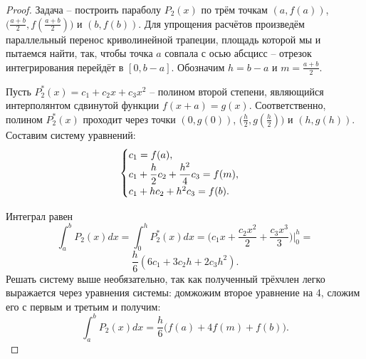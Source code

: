 \documentclass[../main.tex]{subfile}
\begin{document}
\begin{proof}
	Задача -- построить параболу $P_2(x)$ по трём точкам $(a,f(a))$,
	$\big(\frac{a+b}{2},f(\frac{a+b}{2})\big)$ и $(b,f(b))$. Для упрощения
	расчётов произведём параллельный перенос криволинейной трапеции, площадь
	которой мы и пытаемся найти, так, чтобы точка $a$ совпала с осью
	абсцисс -- отрезок интегрирования перейдёт в $[0,b-a]$. Обозначим
	$h=b-a$ и $m=\frac{a+b}{2}$.

	Пусть $P_2^*(x)=c_1+c_2x+c_3x^2$ -- полином второй степени, являющийся
	интерполянтом сдвинутой функции $f(x+a)=g(x)$. Соответственно, полином
	$P_2^*(x)$ проходит через точки $(0,g(0))$, $\big(\frac{h}{2},
	g(\frac{h}{2})\big)$ и $(h,g(h))$. Составим систему уравнений:
	\begin{equation*}
		\begin{cases}
			c_1 = f(a), \\
			c_1 + \mathlarger{\frac{h}{2}}c_2 + \mathlarger{\frac
				{h^2}{4}}c_3 = f(m), \\
			c_1 + h c_2 + h^2 c_3 = f(b). \\
		\end{cases}
	\end{equation*}

	Интеграл равен
	\[\int_a^b P_2(x)dx=\int_0^h P_2^*(x)dx=\Big(c_1x+\frac{c_2x^2}{2}+
	\frac{c_3x^3}{3}\Big)\Big|_0^h=\]
	\[\frac{h}{6}(6c_1+3c_2h+2c_3h^2).\]
	Решать систему выше необязательно, так как полученный трёхчлен легко
	выражается через уравнения системы: домжожим второе уравнение на 4,
	сложим его с первым и третьим и получим:
	\[\int_a^b P_2(x)dx=\frac{h}{6}\big(f(a)+4f(m)+f(b)\big).\]
\end{proof}
\end{document}
